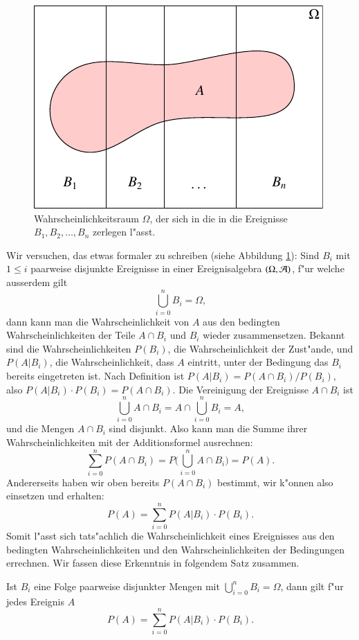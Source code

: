 \begin{figure}
\begin{center}
\includegraphics{images/total-1.pdf}
\end{center}
\caption{Wahrscheinlichkeitsraum $\Omega$, der sich in die in die
Ereignisse $B_1,B_2,\dots,B_n$ zerlegen l"asst.\label{zerlegung}}
\end{figure}
Wir versuchen, das etwas formaler zu schreiben
(siehe Abbildung \ref{zerlegung}):
Sind $B_i$ mit $1\le i$ paarweise
disjunkte Ereignisse
in einer Ereignisalgebra $(\Omega,{\cal A})$, f"ur welche ausserdem
gilt
\[
\bigcup_{i=0}^{n}B_i = \Omega,
\]
dann kann man die Wahrscheinlichkeit von $A$ aus den bedingten
Wahrscheinlichkeiten der Teile $A\cap B_i$ und $B_i$ wieder zusammensetzen.
Bekannt sind die Wahrscheinlichkeiten
$P(B_i)$, die Wahrscheinlichkeit der Zust"ande, und
$P(A|B_i)$, die Wahrscheinlichkeit, dass $A$ eintritt, unter der Bedingung
das $B_i$ bereits eingetreten ist.
Nach Definition ist $P(A|B_i)=P(A\cap B_i)/P(B_i)$, also
$P(A|B_i)\cdot P(B_i) = P(A\cap B_i)$. Die Vereinigung der Ereignisse
$A\cap B_i$ ist
\[
\bigcup_{i=0}^{n} A\cap B_i=A\cap\bigcup_{i=0}^{n}B_i=A,
\]
und die Mengen $A\cap B_i$ sind disjunkt. Also kann man die Summe ihrer
Wahrscheinlichkeiten mit der Additionsformel ausrechnen:
\[
\sum_{i=0}^{n}P(A\cap B_i)=P\biggl(\bigcup_{i=0}^{n}A\cap B_i\biggr)=P(A).
\]
Andererseits
haben wir oben bereits $P(A\cap B_i)$ bestimmt, wir k"onnen
also einsetzen und erhalten:
\[
P(A)=\sum_{i=0}^{n}P(A|B_i)\cdot P(B_i).
\]
Somit l"asst sich tats"achlich die Wahrscheinlichkeit eines Ereignisses
aus den bedingten Wahrscheinlichkeiten und den Wahrscheinlichkeiten
der Bedingungen errechnen. Wir fassen diese Erkenntnis in folgendem 
Satz zusammen.
\begin{satz}
Ist $B_i$ eine Folge paarweise disjunkter Mengen mit $\bigcup_{i=0}^{n}B_i=\Omega$, dann gilt f"ur jedes Ereignis $A$
\[
P(A)=\sum_{i=0}^{n}P(A|B_i)\cdot P(B_i).
\]
\end{satz}
